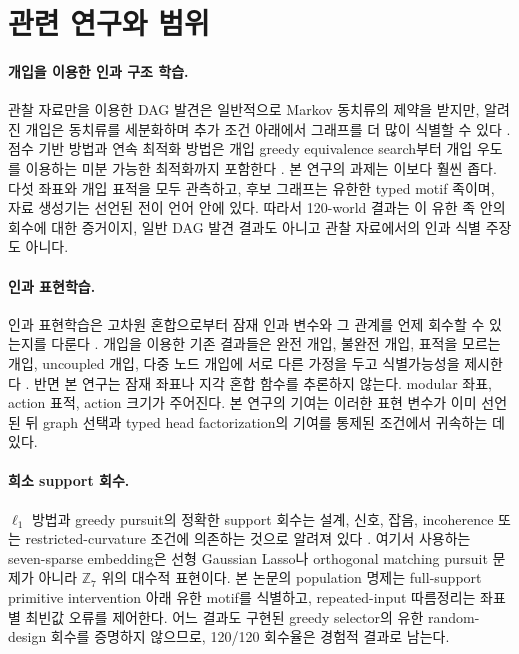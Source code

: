 \section{관련 연구와 범위}

\paragraph{개입을 이용한 인과 구조 학습.}
관찰 자료만을 이용한 DAG 발견은 일반적으로 Markov 동치류의 제약을 받지만,
알려진 개입은 동치류를 세분화하며 추가 조건 아래에서 그래프를 더 많이 식별할
수 있다 \citep{hauser2012interventional,yang2018interventions}.
점수 기반 방법과 연속 최적화 방법은 개입 greedy equivalence search부터 개입
우도를 이용하는 미분 가능한 최적화까지 포함한다
\citep{zheng2018notears,brouillard2020dcdi}. 본 연구의 과제는 이보다 훨씬
좁다. 다섯 좌표와 개입 표적을 모두 관측하고, 후보 그래프는 유한한 typed motif
족이며, 자료 생성기는 선언된 전이 언어 안에 있다. 따라서 120-world 결과는 이
유한 족 안의 회수에 대한 증거이지, 일반 DAG 발견 결과도 아니고 관찰 자료에서의
인과 식별 주장도 아니다.

\paragraph{인과 표현학습.}
인과 표현학습은 고차원 혼합으로부터 잠재 인과 변수와 그 관계를 언제 회수할 수
있는지를 다룬다 \citep{scholkopf2021causalrep}. 개입을 이용한 기존 결과들은
완전 개입, 불완전 개입, 표적을 모르는 개입, uncoupled 개입, 다중 노드 개입에
서로 다른 가정을 두고 식별가능성을 제시한다
\citep{ahuja2023interventional,vonkugelgen2023nonparametric,
bing2024multinode,varici2024general}. 반면 본 연구는 잠재 좌표나 지각 혼합
함수를 추론하지 않는다. modular 좌표, action 표적, action 크기가 주어진다.
본 연구의 기여는 이러한 표현 변수가 이미 선언된 뒤 graph 선택과 typed head
factorization의 기여를 통제된 조건에서 귀속하는 데 있다.

\paragraph{희소 support 회수.}
$\ell_1$ 방법과 greedy pursuit의 정확한 support 회수는 설계, 신호, 잡음,
incoherence 또는 restricted-curvature 조건에 의존하는 것으로 알려져 있다
\citep{tropp2007omp,wainwright2009sharp,dyer2013greedy,
bahmani2013grasp}. 여기서 사용하는 seven-sparse embedding은 선형 Gaussian
Lasso나 orthogonal matching pursuit 문제가 아니라 $\mathbb Z_7$ 위의 대수적
표현이다. 본 논문의 population 명제는 full-support primitive intervention 아래
유한 motif를 식별하고, repeated-input 따름정리는 좌표별 최빈값 오류를 제어한다.
어느 결과도 구현된 greedy selector의 유한 random-design 회수를 증명하지
않으므로, 120/120 회수율은 경험적 결과로 남는다.

